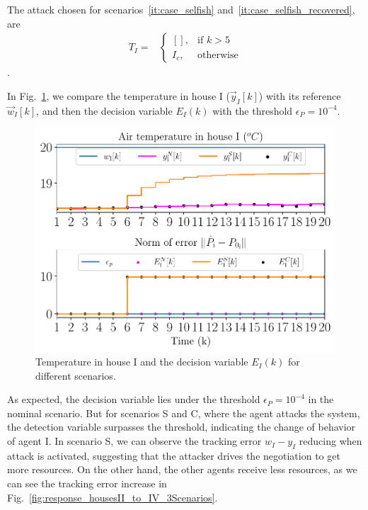 \documentclass[../main.tex]{subfiles}
\begin{document}
The attack chosen for scenarios~\ref{it:case_selfish} and~\ref{it:case_selfish_recovered},
are
\begin{align}
  T_{I}=&\begin{cases}
          \left[\right],&\text{if }k> 5\\
          I_{c},&\text{otherwise}
        \end{cases}
\end{align}
.

In Fig.~\ref{fig:response_houseI_3Scenarios}, we compare the temperature in house I ($\vec{y}_{I}[k]$) with its reference $\vec{w}_{I}[k]$, and then the
decision variable ${E_{I}(k)}$ with the threshold
$\epsilon_{P}=10^{-4}$.

\begin{figure}[h]
  \centering
  \includegraphics[width=.7\textwidth]{../img/resilient_eq/ErrorWX_command_normErrH.pdf}
\caption{Temperature in house I and the decision variable $E_{I}(k)$ for different scenarios.}\label{fig:response_houseI_3Scenarios}
\end{figure}
As expected, the decision variable lies under the threshold $\epsilon_{P}=10^{-4}$ in the nominal scenario.
But for scenarios S and C, where the agent attacks the system, the detection variable surpasses the threshold, indicating the change of behavior of agent I.
In scenario S, we can observe the tracking error ${w_{I}-y_{I}}$ reducing when attack is activated, suggesting that the attacker drives the negotiation to get more resources.
On the other hand, the other agents receive less resources, as we can see the tracking error increase in Fig.~\ref{fig:response_housesII_to_IV_3Scenarios}.
\end{document}

